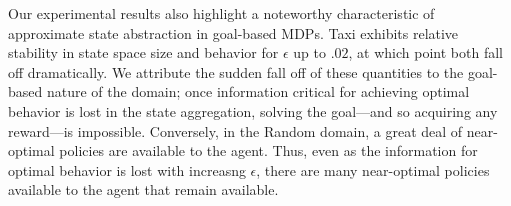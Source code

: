 
Our experimental results also highlight a noteworthy characteristic of approximate state abstraction in goal-based \acp{MDP}. Taxi exhibits relative stability in state space size and behavior for $\epsilon$ up to $.02$, at which point both fall off dramatically. We attribute the sudden fall off of these quantities to the goal-based nature of the domain; once information critical for achieving optimal behavior is lost in the state aggregation, solving the goal---and so acquiring any reward---is impossible. Conversely, in the Random domain, a great deal of near-optimal policies are available to the agent. Thus, even as the information for optimal behavior is lost with increasng $\epsilon$, there are many near-optimal policies available to the agent that remain available.


